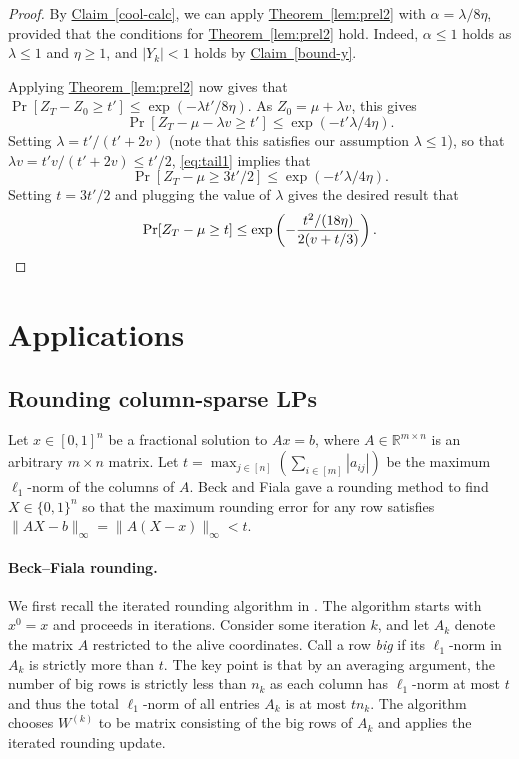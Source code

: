 \documentclass[11pt]{article}
\theoremstyle{definition}
\newcommand{\expref}[2]{\texorpdfstring{\hyperref[#2]{#1~\ref{#2}}}{#1~\ref{#2}}}
\newcommand{\R}{{\mathbb R}}
\begin{document}
\begin{proof}
By \expref{Claim}{cool-calc}, we can  apply \expref{Theorem}{lem:prel2}  with $\alpha =  \lambda/8\eta$, provided that the conditions for \expref{Theorem}{lem:prel2} hold. 
Indeed, $\alpha \leq 1$ holds as $\lambda \leq 1$ and $\eta \geq 1$, and $|Y_k|< 1$ holds by \expref{Claim}{bound-y}.

Applying \expref{Theorem}{lem:prel2} now gives that $ \Pr[Z_T - Z_0 \geq t'] \leq \exp(-\lambda t'/8\eta)$. As $Z_0=\mu + \lambda v$, this gives
\begin{equation}
    \label{eq:tail1}
    \Pr[ Z_T - \mu - \lambda v \geq  t'] \leq \exp(-t' \lambda/4\eta).
\end{equation}
Setting $\lambda = t'/(t' + 2 v)$ (note that this satisfies our assumption $\lambda \leq 1$), so that $\lambda v  = t'v/(t'+2v) \leq t'/2$, \eqref{eq:tail1} implies that \[
 \Pr[ Z_T - \mu \geq  3t'/2] \leq \exp(- t' \lambda/4\eta). \]
Setting $t=3t'/2$ and plugging the value of $\lambda$ gives the desired result that
 \[ \Pr[Z_T  - \mu \geq t ] \leq \exp\left(-\frac{t^2/(18\eta)}{2(v + t/3)}  \right) .\qedhere \]
\end{proof}

\section{Applications}
\subsection{Rounding column-sparse LPs}
\label{s:bf}
Let $x \in [0,1]^n$ be a fractional solution to $Ax = b$,
where $A \in \R^{m \times n}$ is an arbitrary $m \times n$ matrix. Let $t = \max_{j\in [n]} (\sum_{i\in [m]} |a_{ij}|)$ be the maximum $\ell_1$-norm of the columns
of $A$. Beck and Fiala \cite{BF81} gave a rounding method to find $X \in \{0,1\}^n$ so that the maximum rounding error for any row satisfies $\|AX-b\|_\infty = \|A(X-x)\|_\infty < t$.
\paragraph{Beck--Fiala rounding.} We first recall the iterated rounding algorithm in \cite{BF81}. The algorithm starts with $x^{0}=x$ and proceeds in iterations.
Consider some iteration $k$, and let $A_k$ denote the matrix $A$ restricted to the alive coordinates.
Call a row \emph{big} if its $\ell_1$-norm in $A_k$ is strictly more than $t$. The key point is that by an averaging argument, the number of big rows is strictly less than $n_k$ as each column has $\ell_1$-norm at most $t$ and thus
the total $\ell_1$-norm of all entries $A_k$ is at most $tn_k$.
The algorithm chooses $W^{(k)}$ to be matrix consisting of the big rows of $A_k$ and applies the iterated rounding update.
\end{document}
